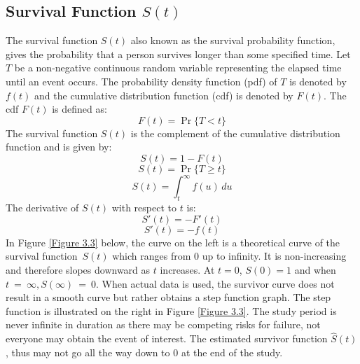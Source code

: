\documentclass[doublespacing,12pt]{report}
\begin{document}
\subsection{\texorpdfstring{Survival Function \( S(t) \)}{Survival Function S(t)}}
The survival function \(S\left(t\right) \) also known as the survival probability function, gives the probability that a person survives longer than some specified time.  Let \(T\) be a non-negative continuous random variable representing the elapsed time until an event occurs. The probability density function (pdf) of \(T\) is denoted by \(f(t)\) and the cumulative distribution function (cdf) is denoted by \(F(t)\). The cdf \(F(t)\) is defined as:
\begin{equation}
F(t) = \Pr\{T < t\}
\end{equation}
The survival function \(S(t)\) is the complement of the cumulative distribution function and is given by:
\begin{equation}
S(t) = 1 - F(t)
\end{equation}
\begin{equation}
S(t) = \Pr\{T \geq t\}
\end{equation}
\begin{equation}
S(t) = \int_t^\infty f(u) \, du
\end{equation}
The derivative of \(S(t)\) with respect to \(t\) is:
\begin{equation}
S'(t) = -F'(t)
\end{equation}
\begin{equation}
S'(t) = -f(t)
\end{equation}
In Figure \ref{Figure 3.3} below, the curve on the left is a theoretical curve of the survival function\ \(S\left(t\right) \) which ranges from 0 up to infinity. It is non-increasing and therefore slopes downward as \(t\) increases. At \(t= 0\), \(S\left(0\right)=1\) and when \( t\ =\ \infty, S\left(\infty\right)\ =\ 0.\) When actual data is used, the survivor curve does not result in a smooth curve but rather obtains a step function graph. The step function is illustrated on the right in Figure \ref{Figure 3.3}.  The study period is never infinite in duration as there may be competing risks for failure, not everyone may obtain the event of interest. The estimated survivor function \(\hat{S}\left(t\right)\), thus may not go all the way down to 0 at the end of the study.
\end{document}
